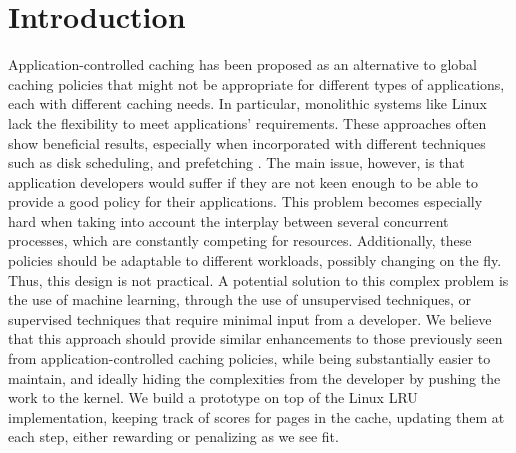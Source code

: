 \section{Introduction}

Application-controlled caching has been proposed as an alternative to global caching policies that might not be appropriate for different types of applications, each with different caching needs. In particular, monolithic systems like Linux lack the flexibility to meet applications' requirements. These approaches often show beneficial results, especially when incorporated with different techniques such as disk scheduling, and prefetching \cite{Cao:1996}. The main issue, however, is that application developers would suffer if they are not keen enough to be able to provide a good policy for their applications. This problem becomes especially hard when taking into account the interplay between several concurrent processes, which are constantly competing for resources. Additionally, these policies should be adaptable to different workloads, possibly changing on the fly. Thus, this design is not practical. A potential solution to this complex problem is the use of machine learning, through the use of unsupervised techniques, or supervised techniques that require minimal input from a developer. We believe that this approach should provide similar enhancements to those previously seen from application-controlled caching policies, while being substantially easier to maintain, and ideally hiding the complexities from the developer by pushing the work to the kernel. We build a prototype on top of the Linux LRU implementation, keeping track of scores for pages in the cache, updating them at each step, either rewarding or penalizing as we see fit.
